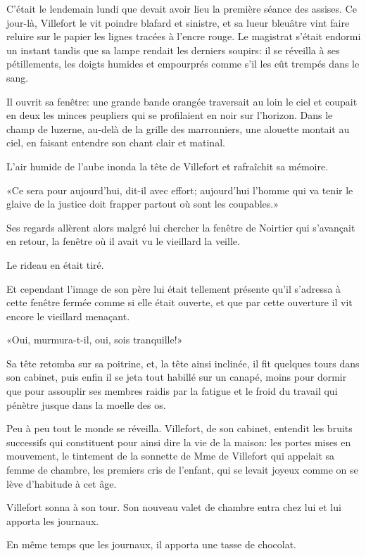 C'était le lendemain lundi que devait avoir lieu la première séance des assises. Ce jour-là, Villefort le vit poindre blafard et sinistre, et sa lueur bleuâtre vint faire reluire sur le papier les lignes tracées à l'encre rouge. Le magistrat s'était endormi un instant tandis que sa lampe rendait les derniers soupirs: il se réveilla à ses pétillements, les doigts humides et empourprés comme s'il les eût trempés dans le sang. 

Il ouvrit sa fenêtre: une grande bande orangée traversait au loin le ciel et coupait en deux les minces peupliers qui se profilaient en noir sur l'horizon. Dans le champ de luzerne, au-delà de la grille des marronniers, une alouette montait au ciel, en faisant entendre son chant clair et matinal. 

L'air humide de l'aube inonda la tête de Villefort et rafraîchit sa mémoire. 

«Ce sera pour aujourd'hui, dit-il avec effort; aujourd'hui l'homme qui va tenir le glaive de la justice doit frapper partout où sont les coupables.» 

Ses regards allèrent alors malgré lui chercher la fenêtre de Noirtier qui s'avançait en retour, la fenêtre où il avait vu le vieillard la veille. 

Le rideau en était tiré. 

Et cependant l'image de son père lui était tellement présente qu'il s'adressa à cette fenêtre fermée comme si elle était ouverte, et que par cette ouverture il vit encore le vieillard menaçant. 

«Oui, murmura-t-il, oui, sois tranquille!» 

Sa tête retomba sur sa poitrine, et, la tête ainsi inclinée, il fit quelques tours dans son cabinet, puis enfin il se jeta tout habillé sur un canapé, moins pour dormir que pour assouplir ses membres raidis par la fatigue et le froid du travail qui pénètre jusque dans la moelle des os. 

Peu à peu tout le monde se réveilla. Villefort, de son cabinet, entendit les bruits successifs qui constituent pour ainsi dire la vie de la maison: les portes mises en mouvement, le tintement de la sonnette de Mme de Villefort qui appelait sa femme de chambre, les premiers cris de l'enfant, qui se levait joyeux comme on se lève d'habitude à cet âge. 

Villefort sonna à son tour. Son nouveau valet de chambre entra chez lui et lui apporta les journaux. 

En même temps que les journaux, il apporta une tasse de chocolat. 

